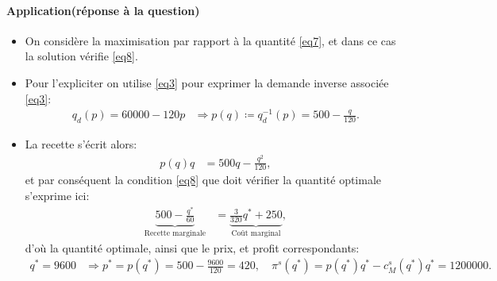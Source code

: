 \begin{frame}
  [allowframebreaks]{\insertsection}
  \framesubtitle{Application(réponse à la question)}
  \begin{itemize}
  \item On considère la maximisation par rapport à la quantité \eqref{eq7}, et dans ce cas la solution vérifie \eqref{eq8}.
  \item Pour l'expliciter on utilise \eqref{eq3} pour exprimer la demande inverse associée \eqref{eq3}:
  \begin{align*}
  q_d(p) = 60000 - 120p &\Rightarrow p(q) \coloneqq q_d^{-1}(p) =500- \frac{q}{120}.
  \end{align*}
 \item La recette s'écrit alors:
 \begin{align*}
p(q)q &= 500q -  \frac{q^2}{120},
 \end{align*}
 et par conséquent  la condition \eqref{eq8}  que doit vérifier la quantité optimale s'exprime ici:
 \begin{align*}
\underbrace{ 500 - \frac{q^*}{60}}_{\text{Recette marginale}} &=  \underbrace{\frac{3}{320}q^* + 250}_{\text{Coût marginal}},
 \end{align*}
 d'où la quantité optimale, ainsi que le prix, et profit correspondants:
  \begin{align*}
  q^* = 9600 &\Rightarrow p^*  = p(q^*) = 500 - \frac{9600}{120}= 420, \quad \pi^s(q^*) = p(q^*)q^* - c_M^s(q^*) q^* = 1200000.
   \end{align*}
  \end{itemize}
   \end{frame}
   
